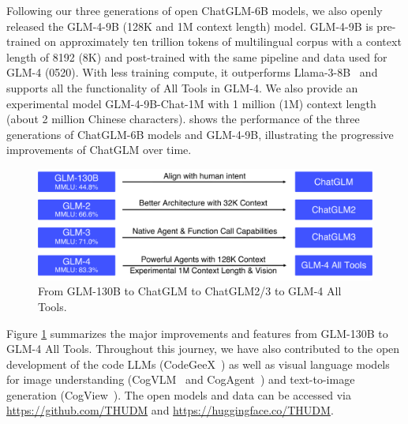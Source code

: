Following our three generations of open ChatGLM-6B models, we also openly released the GLM-4-9B (128K and 1M context length) model. 
GLM-4-9B is pre-trained on approximately ten trillion tokens of multilingual corpus with a context length of 8192 (8K) and post-trained with the same pipeline and data used for GLM-4 (0520). 
With less training compute, it outperforms Llama-3-8B~\cite{llama3} and  supports all the functionality of All Tools in GLM-4. 
We also provide an experimental model GLM-4-9B-Chat-1M with 1 million (1M) context length (about 2 million Chinese characters). 
 shows the performance of the three generations of ChatGLM-6B models and GLM-4-9B, illustrating the progressive improvements of ChatGLM over time.  


 
\begin{figure}[!ht]
    \centering
    \includegraphics[width=.75\linewidth]{figs/glm130toglm4-2.pdf}
    \caption{From GLM-130B to ChatGLM to ChatGLM2/3 to GLM-4 All Tools. %
    }
    \label{fig:glm130-glm4at}
\end{figure}


Figure \ref{fig:glm130-glm4at} summarizes the major improvements and features from GLM-130B to GLM-4 All Tools. 
Throughout this journey, we have also contributed to the open development of the code LLMs (CodeGeeX~\cite{zheng2023codegeex}) as well as visual language models for image understanding (CogVLM~\cite{wang2023cogvlm} and CogAgent~\cite{hong2023cogagent}) and text-to-image generation (CogView~\cite{ding2021cogview,zheng2024cogview3}). 
The open models and data can be accessed via \url{https://github.com/THUDM} and \url{https://huggingface.co/THUDM}. 
 




